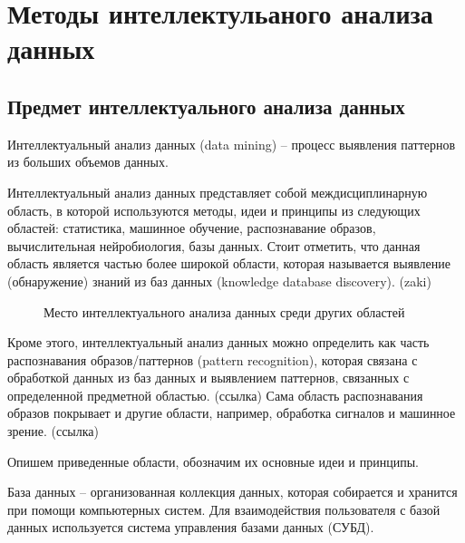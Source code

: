 \section{Методы интеллектульаного анализа данных}

\subsection{Предмет интеллектуального анализа данных}

Интеллектуальный анализ данных (data mining) 
-- процесс выявления паттернов из больших объемов данных. \cite{curr}

Интеллектуальный анализ данных представляет собой междисциплинарную область,
в которой используются методы, идеи и принципы из следующих областей:
статистика, машинное обучение, распознавание образов,
вычислительная нейробиология, базы данных.
Стоит отметить, что данная область является частью более широкой области, 
которая называется выявление (обнаружение) знаний из баз данных (knowledge database discovery).
(zaki)

\begin{figure}[h]
    \caption{Место интеллектуального анализа данных среди других областей}
\end{figure}

Кроме этого, интеллектуальный анализ данных можно определить как часть
распознавания образов/паттернов (pattern recognition),
которая связана с обработкой данных из баз данных и выявлением паттернов, 
связанных с определенной предметной областью. (ссылка)
Сама область распознавания образов покрывает и другие области, например,
обработка сигналов и машинное зрение. (ссылка)

Опишем приведенные области, обозначим их основные идеи и принципы.

База данных -- организованная коллекция данных, которая собирается и хранится
при помощи компьютерных систем.
Для взаимодействия пользователя с базой данных используется
система управления базами данных (СУБД).

